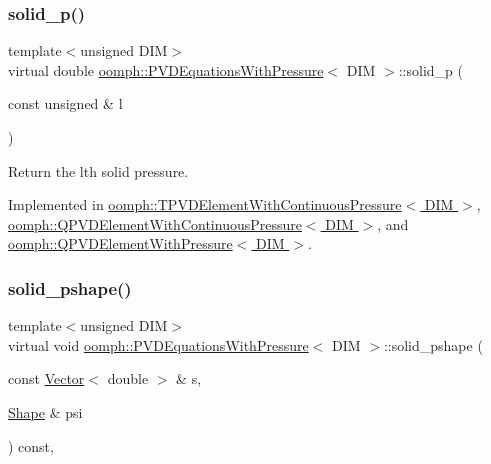 \subsubsection{\texorpdfstring{solid\+\_\+p()}{solid\_p()}}
{\footnotesize\ttfamily template$<$unsigned D\+IM$>$ \\
virtual double \hyperlink{classoomph_1_1PVDEquationsWithPressure}{oomph\+::\+P\+V\+D\+Equations\+With\+Pressure}$<$ D\+IM $>$\+::solid\+\_\+p (\begin{DoxyParamCaption}\item[{const unsigned \&}]{l }\end{DoxyParamCaption})\hspace{0.3cm}{\ttfamily [pure virtual]}}



Return the lth solid pressure. 



Implemented in \hyperlink{classoomph_1_1TPVDElementWithContinuousPressure_aa0a9aad423ffe12eb10f07af6850191c}{oomph\+::\+T\+P\+V\+D\+Element\+With\+Continuous\+Pressure$<$ D\+I\+M $>$}, \hyperlink{classoomph_1_1QPVDElementWithContinuousPressure_a28df8e859a4201842857e6ad7dbc7ecd}{oomph\+::\+Q\+P\+V\+D\+Element\+With\+Continuous\+Pressure$<$ D\+I\+M $>$}, and \hyperlink{classoomph_1_1QPVDElementWithPressure_ae60d58f767b89eb8ecf147da5e646bf3}{oomph\+::\+Q\+P\+V\+D\+Element\+With\+Pressure$<$ D\+I\+M $>$}.

\mbox{\label{classoomph_1_1PVDEquationsWithPressure_ad580f7919412f6b574b76f514f56282c}} 
\subsubsection{\texorpdfstring{solid\+\_\+pshape()}{solid\_pshape()}}
{\footnotesize\ttfamily template$<$unsigned D\+IM$>$ \\
virtual void \hyperlink{classoomph_1_1PVDEquationsWithPressure}{oomph\+::\+P\+V\+D\+Equations\+With\+Pressure}$<$ D\+IM $>$\+::solid\+\_\+pshape (\begin{DoxyParamCaption}\item[{const \hyperlink{classoomph_1_1Vector}{Vector}$<$ double $>$ \&}]{s,  }\item[{\hyperlink{classoomph_1_1Shape}{Shape} \&}]{psi }\end{DoxyParamCaption}) const\hspace{0.3cm}{\ttfamily [protected]}, {}}




